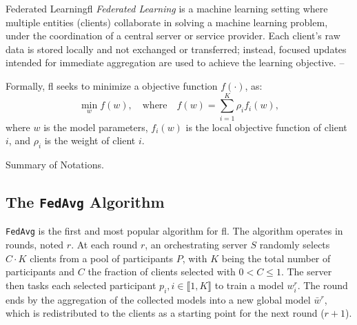 \begin{definitionbox}{Federated Learning}{fl}
  \emph{Federated Learning} is a machine learning setting where multiple entities (clients) collaborate in solving a machine learning problem, under the coordination of a central server or service provider.
  Each client’s raw data is stored locally and not exchanged or transferred; instead, focused updates intended for immediate aggregation are used to achieve the learning objective. -- \textcite{kairouz_AdvancesOpenProblems_2021}

  \tcblower

  Formally, \gls{fl} seeks to minimize a objective function $f(\cdot)$\footnotemark, as:
  \begin{equation}
    \min_{w} f(w), \quad \text{where} \quad f(w) = \sum_{i=1}^{K} \rho_i f_i(w),
  \end{equation}
  where $w$ is the model parameters, $f_i(w)$ is the local objective function of client $i$, and $\rho_i$ is the weight of client $i$.

\end{definitionbox}


\begin{table}[ht]
  \centering
  \caption{Summary of Notations.\label{tbl:notations}}
  
\end{table}


\subsection{The \texttt{FedAvg} Algorithm\label{sec:bg.fl.fedavg}}

\texttt{FedAvg} is the first and most popular algorithm for \gls{fl}.
The algorithm operates in rounds, noted $r$.
At each round $r$, an orchestrating server $S$ randomly selects $C \cdot K$ clients from a pool of participants $P$, with $K$ being the total number of participants and $C$ the fraction of clients selected with $0 < C \leq 1$.
The server then tasks each selected participant $p_i, i\in \llbracket 1,K \rrbracket$ to train a model $w_i^r$.
The round ends by the aggregation of the collected models into a new global model $\bar{w}^r$, which is redistributed to the clients as a starting point for the next round ($r+1$).

